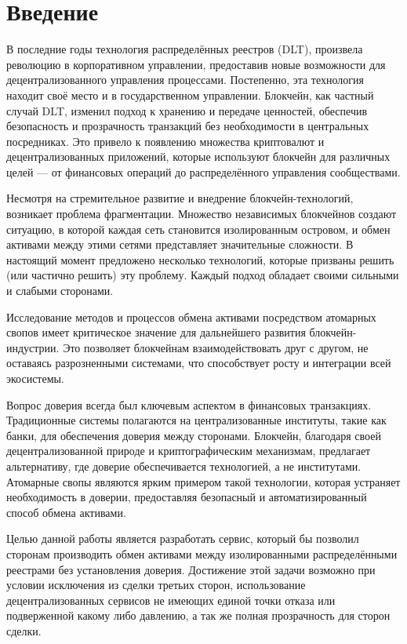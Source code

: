 \chapter*{Введение}

В последние годы технология распределённых реестров (DLT), произвела революцию в корпоративном управлении, предоставив новые возможности для децентрализованного управления процессами. Постепенно, эта технология находит своё место и в государственном управлении. Блокчейн, как частный случай DLT, изменил подход к хранению и передаче ценностей, обеспечив безопасность и прозрачность транзакций без необходимости в центральных посредниках. Это привело к появлению множества криптовалют и децентрализованных приложений, которые используют блокчейн для различных целей — от финансовых операций до распределённого управления сообществами.

Несмотря на стремительное развитие и внедрение блокчейн-технологий, возникает проблема фрагментации. Множество независимых блокчейнов создают ситуацию, в которой каждая сеть становится изолированным островом, и обмен активами между этими сетями представляет значительные сложности. В настоящий момент предложено несколько технологий, которые призваны решить (или частично решить) эту проблему. Каждый подход обладает своими сильными и слабыми сторонами.

Исследование методов и процессов обмена активами посредством атомарных свопов имеет критическое значение для дальнейшего развития блокчейн-индустрии. Это позволяет блокчейнам взаимодействовать друг с другом, не оставаясь разрозненными системами, что способствует росту и интеграции всей экосистемы.

Вопрос доверия всегда был ключевым аспектом в финансовых транзакциях. Традиционные системы полагаются на централизованные институты, такие как банки, для обеспечения доверия между сторонами. Блокчейн, благодаря своей децентрализованной природе и криптографическим механизмам, предлагает альтернативу, где доверие обеспечивается технологией, а не институтами. Атомарные свопы являются ярким примером такой технологии, которая устраняет необходимость в доверии, предоставляя безопасный и автоматизированный способ обмена активами.

Целью данной работы является разработать сервис, который бы позволил сторонам производить обмен активами между изолированными распределёнными реестрами без установления доверия. Достижение этой задачи возможно при условии исключения из сделки третьих сторон, использование децентрализованных сервисов не имеющих единой точки отказа или подверженной какому либо давлению, а так же полная прозрачность для сторон сделки.

